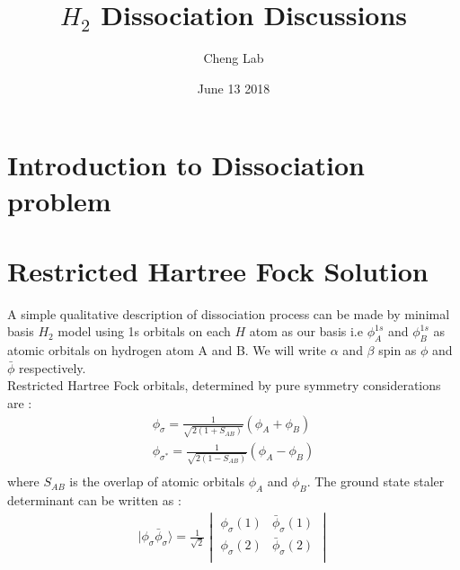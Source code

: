 \documentclass[11pt]{article}   	%
\begin{document}
\title{$H_2$ Dissociation Discussions}
\author{Cheng Lab}
\date{June 13 2018}							%
\maketitle
\section{Introduction to Dissociation problem}
\section{Restricted Hartree Fock Solution}
	A simple qualitative description of dissociation process can be made by minimal basis 
	$H_2$ model using 1s orbitals on each $H$ atom as our basis
	i.e $\phi_A^{1s}$ and $\phi_B^{1s}$ as atomic orbitals on hydrogen atom A and B.  
	We will write $\alpha$ and $\beta$ spin as $\phi$ and $\bar{\phi}$ respectively. \\
	Restricted Hartree Fock orbitals, determined by pure symmetry considerations are :\\ 
	\begin{equation}
	\begin{split}
	\phi_{\sigma}=\frac{1}{\sqrt{2(1+S_{AB})}}(\phi_A+\phi_B) \\	
	\phi_{\sigma^*}=\frac{1}{\sqrt{2(1-S_{AB})}}(\phi_A-\phi_B) \\
	\end{split}
	\end{equation}
	where $S_{AB}$ is the overlap of atomic orbitals $\phi_A$ and $\phi_B$. The ground state staler determinant can be written as :\\
	\begin{equation}
	\begin{split}
	|\phi_{\sigma}\bar{\phi}_{\sigma}\rangle=\frac{1}{\sqrt{2}} \begin{vmatrix}\phi_{\sigma}(1) 
	& \bar{\phi}_{\sigma}(1) \\  \phi_{\sigma}(2) & \bar{\phi}_{\sigma}(2) \\ \end{vmatrix}  \\
	\end{split}
	\end{equation}
	
\end{document}
